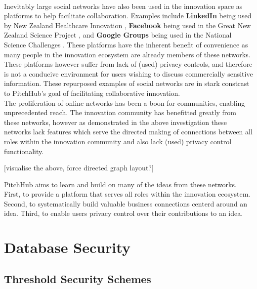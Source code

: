 \\
\newline
Inevitably large social networks have also been used in the innovation space as platforms to help facilitate collaboration. Examples include \textbf{LinkedIn} \cite{Linkedin:online} being used by New Zealand Healthcare Innovation \cite{nzHealthCare:online}, \textbf{Facebook} \cite{Faceb6:online} being used in the Great New Zealand Science Project \cite{greatNZScience:online}, and \textbf{Google Groups} \cite{Googlegroups:online} being used in the National Science Challenges \cite{nzNSC10:online}. These platforms have the inherent benefit of convenience as many people in the innovation ecosystem are already members of these networks. These platforms however suffer from lack of (used) privacy controls, and therefore is not a conducive environment for users wishing to discuss commercially sensitive information. These repurposed examples of social networks are in stark constrast to PitchHub's goal of facilitating collaborative innovation.
\\
\newline
The proliferation of online networks has been a boon for communities, enabling unprecedented reach. The innovation community has benefitted greatly from these networks, however as demonstrated in the above investigation these networks lack features which serve the directed making of connections between all roles within the innovation community and also lack (used) privacy control functionality.

[visualise the above, force directed graph layout?]

PitchHub aims to learn and build on many of the ideas from these networks. First, to provide a platform that serves all roles within the innovation ecosystem. Second, to systematically build valuable business connections centerd around an idea. Third, to enable users privacy control over their contributions to an idea.

\section{Database Security}

\subsection{Threshold Security Schemes}